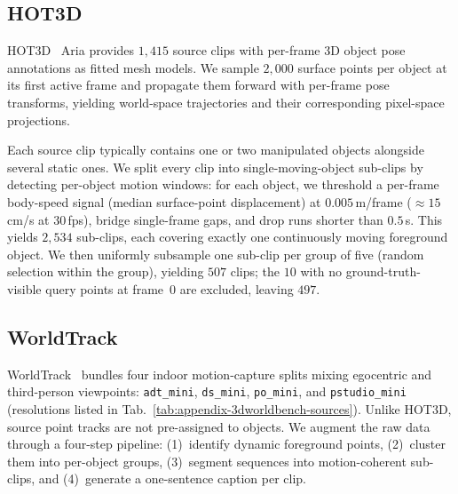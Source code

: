 \documentclass{llmxive}
\begin{document}
\subsection{HOT3D}
\label{subsec:appendix_hot3d}

HOT3D~\cite{hot3d} Aria provides $1{,}415$ source clips with per-frame 3D object pose
annotations as fitted mesh models. We sample $2{,}000$ surface points per
object at its first active frame and propagate them forward with per-frame
pose transforms, yielding world-space trajectories and their corresponding
pixel-space projections.

Each source clip typically contains one or two manipulated objects alongside
several static ones. We split every clip into single-moving-object sub-clips by detecting
per-object motion windows: for each object, we threshold a per-frame
body-speed signal (median surface-point displacement) at $0.005$\,m/frame
(${\approx}15$\,cm/s at $30$\,fps), bridge single-frame gaps, and drop runs
shorter than $0.5$\,s. This yields $2{,}534$ sub-clips, each
covering exactly one continuously moving foreground object. We then uniformly
subsample one sub-clip per group of five (random selection within the group),
yielding $507$ clips; the $10$ with no ground-truth-visible query points at frame~$0$
are excluded, leaving $497$.


\subsection{WorldTrack}
\label{subsec:appendix_worldtrack_pipeline}

WorldTrack~\cite{feng2025st4rtrack} bundles four indoor motion-capture splits
mixing egocentric and third-person viewpoints: \texttt{adt\_mini},
\texttt{ds\_mini}, \texttt{po\_mini}, and \texttt{pstudio\_mini} (resolutions
listed in Tab.~\ref{tab:appendix-3dworldbench-sources}). Unlike HOT3D,
source point tracks are not pre-assigned to objects. We augment the raw data
through a four-step pipeline: (1)~identify dynamic foreground points,
(2)~cluster them into per-object groups, (3)~segment sequences into
motion-coherent sub-clips, and (4)~generate a one-sentence caption per clip.
\end{document}

